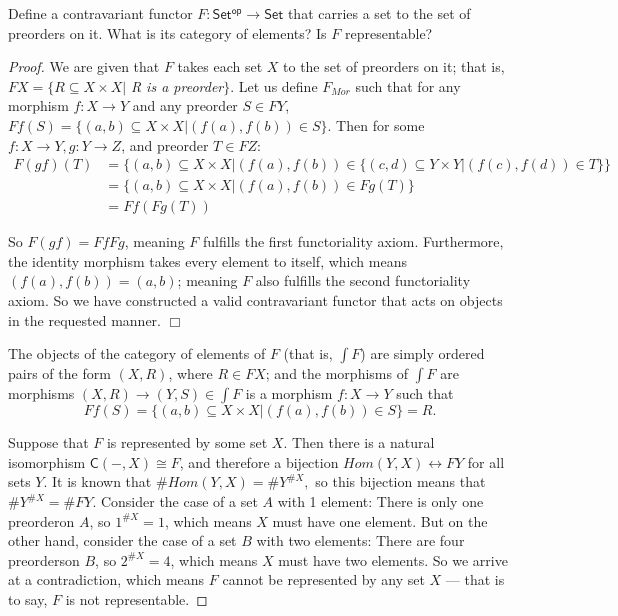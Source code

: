 \documentclass[../../main]{subfiles}
\begin{document}
\begin{exercise}
	Define a contravariant functor $ F \colon \mathsf{Set^{op}} \to \mathsf{Set} $
	that carries a set to the set of preorders on it. What is its category of
	elements? Is $ F $ representable?	
\end{exercise}

\begin{proof} We are given that $ F $ takes each set $ X $ to the set of preorders on it; that is, $FX = \{R \subseteq X \times X | $ \textit{R is a preorder}$ \} $. Let us define $ F_{Mor} $ such that for any morphism $ f: X \to Y $ and any preorder $ S \in FY $, $ Ff(S) = \{(a,b) \subseteq X \times X | (f(a), f(b)) \in S\} $. Then for some $ f: X \to Y, g: Y \to Z $, and preorder $ T \in FZ $:	
\begin{align*}
F(gf)(T) &= \{(a,b) \subseteq X \times X | (f(a), f(b)) \in \{(c,d) \subseteq Y
\times Y | (f(c), f(d)) \in T\}\} \\
&= \{(a,b) \subseteq X \times X | (f(a), f(b)) \in Fg(T)\} \\
&= Ff(Fg(T))
\end{align*}

So $ F(gf) = FfFg $, meaning $ F $ fulfills the first functoriality axiom. Furthermore, the identity morphism takes every element to itself, which means $ (f(a), f(b)) = (a, b) $; meaning $ F $ also fulfills the second functoriality axiom. So we have constructed a valid contravariant functor that acts on objects in the requested manner. $ \Box $

The objects of the category of elements of $ F $ (that is, $ \int F $) are
simply ordered pairs of the form $ (X, R) $, where $ R \in FX $; and the
morphisms of $ \int F $ are morphisms $ (X, R) \to (Y, S) \in \int F $ is a
morphism $ f: X \to Y $ such that \[Ff(S) = \{(a,b) \subseteq X \times X |
(f(a), f(b)) \in S\} = R.\]

Suppose that $ F $ is represented by some set $ X $. Then there is a natural
isomorphism $ \mathsf{C}(-,X) \cong F $, and therefore a bijection $ Hom(Y, X)
\leftrightarrow FY $ for all sets $ Y $. It is known that $ \#Hom(Y, X) =
\#Y^{\#X}, $ so this bijection means that $ \#Y^{\#X} = \#FY $. Consider the
case of a set $ A $ with 1 element: There is only one preorder\footnotemark[1]
on $ A $, so $ 1^{\#X} = 1 $, which means $ X $ must have one element. But on
the other hand, consider the case of a set $ B $ with two elements: There are
four preorders\footnotemark[2] on $ B $, so $ 2^{\#X} = 4 $, which means $ X $
must have two elements. So we arrive at a contradiction, which means $ F $
cannot be represented by any set $ X $ --- that is to say, $ F $ is not
representable.
\end{proof}

\end{document}
